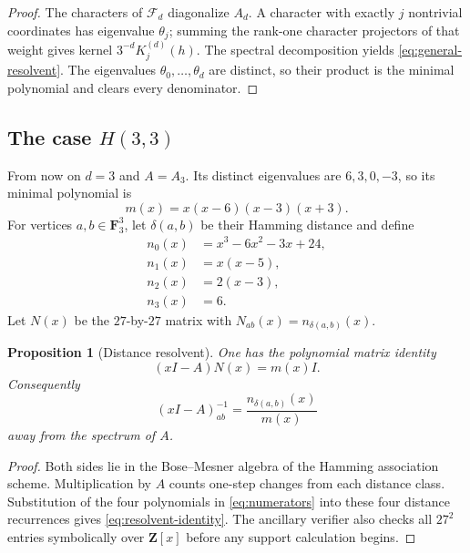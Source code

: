 \documentclass[11pt,reqno]{amsart}
\newtheorem{proposition}[theorem]{Proposition}
\theoremstyle{definition}
\theoremstyle{remark}
\newcommand{\F}{\mathbf F}
\newcommand{\Z}{\mathbf Z}
\begin{document}
\begin{proof}
The characters of $\mathcal F_d$ diagonalize $A_d$.  A character with
exactly $j$ nontrivial coordinates has eigenvalue $\theta_j$; summing the
rank-one character projectors of that weight gives kernel
$3^{-d}K_j^{(d)}(h)$.  The spectral decomposition yields
\eqref{eq:general-resolvent}.  The eigenvalues $\theta_0,\ldots,\theta_d$
are distinct, so their product is the minimal polynomial and clears every
denominator.
\end{proof}

\subsection{The case \texorpdfstring{$H(3,3)$}{H(3,3)}}

From now on $d=3$ and $A=A_3$.  Its distinct eigenvalues are
$6,3,0,-3$, so its minimal polynomial is
\begin{equation}\label{eq:m}
 m(x)=x(x-6)(x-3)(x+3).
\end{equation}
For vertices $a,b\in\F_3^3$, let $\delta(a,b)$ be their Hamming distance and
define
\begin{align}
 n_0(x)&=x^3-6x^2-3x+24,\nonumber\\
 n_1(x)&=x(x-5),\nonumber\\
 n_2(x)&=2(x-3),\label{eq:numerators}\\
 n_3(x)&=6.\nonumber
\end{align}
Let $N(x)$ be the $27$-by-$27$ matrix with
$N_{ab}(x)=n_{\delta(a,b)}(x)$.

\begin{proposition}[Distance resolvent]\label{prop:resolvent}
One has the polynomial matrix identity
\begin{equation}\label{eq:resolvent-identity}
 (xI-A)N(x)=m(x)I.
\end{equation}
Consequently
\[
 (xI-A)^{-1}_{ab}=\frac{n_{\delta(a,b)}(x)}{m(x)}
\]
away from the spectrum of $A$.
\end{proposition}

\begin{proof}
Both sides lie in the Bose--Mesner algebra of the Hamming association
scheme.  Multiplication by $A$ counts one-step changes from each distance
class.  Substitution of the four polynomials in \eqref{eq:numerators} into
these four distance recurrences gives \eqref{eq:resolvent-identity}.
The ancillary verifier also checks all $27^2$ entries symbolically over
$\Z[x]$ before any support calculation begins.
\end{proof}
\end{document}
